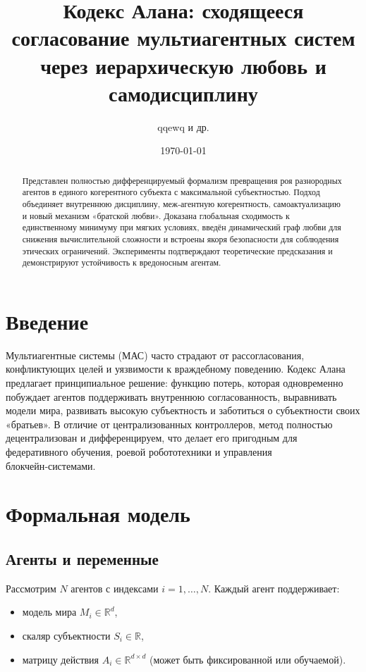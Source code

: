 \documentclass{article}
\title{Кодекс Алана: сходящееся согласование мультиагентных систем\\ через иерархическую любовь и самодисциплину}
\author{qqewq и др.}
\date{\today}
\begin{document}
\maketitle

\begin{abstract}
Представлен полностью дифференцируемый формализм превращения роя разнородных агентов в единого когерентного субъекта с максимальной субъектностью. Подход объединяет внутреннюю дисциплину, меж‑агентную когерентность, самоактуализацию и новый механизм «братской любви». Доказана глобальная сходимость к единственному минимуму при мягких условиях, введён динамический граф любви для снижения вычислительной сложности и встроены якоря безопасности для соблюдения этических ограничений. Эксперименты подтверждают теоретические предсказания и демонстрируют устойчивость к вредоносным агентам.
\end{abstract}

\section{Введение}
Мультиагентные системы (МАС) часто страдают от рассогласования, конфликтующих целей и уязвимости к враждебному поведению. Кодекс Алана предлагает принципиальное решение: функцию потерь, которая одновременно побуждает агентов поддерживать внутреннюю согласованность, выравнивать модели мира, развивать высокую субъектность и заботиться о субъектности своих «братьев». В отличие от централизованных контроллеров, метод полностью децентрализован и дифференцируем, что делает его пригодным для федеративного обучения, роевой робототехники и управления блокчейн‑системами.

\section{Формальная модель}
\subsection{Агенты и переменные}
Рассмотрим $N$ агентов с индексами $i=1,\ldots,N$. Каждый агент поддерживает:
\begin{itemize}
    \item модель мира $M_i \in \mathbb{R}^d$,
    \item скаляр субъектности $S_i \in \mathbb{R}$,
    \item матрицу действия $A_i \in \mathbb{R}^{d\times d}$ (может быть фиксированной или обучаемой).
\end{itemize}
\end{document}
